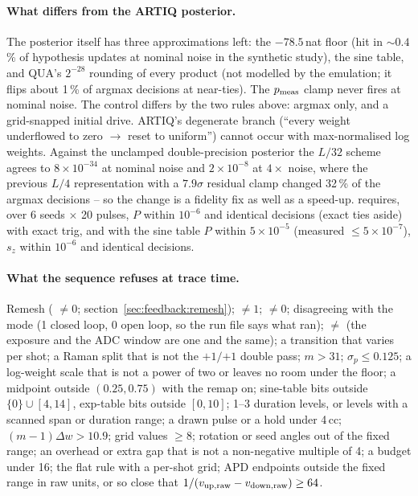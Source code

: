 \paragraph{What differs from the ARTIQ posterior.} The posterior itself has
three approximations left: the $-78.5$\,nat floor (hit in $\sim 0.4$\,\% of
hypothesis updates at nominal noise in the synthetic study), the sine table,
and QUA's $2^{-28}$ rounding of every product (not modelled by the
emulation; it flips about 1\,\% of argmax decisions at near-ties). The
$p_{\rm meas}$ clamp never fires at nominal noise. The control differs by the
two rules above: argmax only, and a grid-snapped initial drive. ARTIQ's
degenerate branch (``every weight underflowed to zero $\to$ reset to uniform'')
cannot occur with max-normalised log weights. Against the unclamped
double-precision posterior the $L/32$ scheme agrees to $8\times 10^{-34}$ at
nominal noise and $2\times 10^{-8}$ at $4\times$ noise, where the previous $L/4$
representation with a $7.9\sigma$ residual clamp changed 32\,\% of the argmax
decisions -- so the change is a fidelity fix as well as a speed-up.
 requires, over 6
seeds $\times$ 20 pulses, $P$ within $10^{-6}$ and identical decisions (exact
ties aside) with exact trig, and with the sine table $P$ within
$5\times 10^{-5}$ (measured $\le 5\times 10^{-7}$), $s_z$ within $10^{-6}$ and
identical decisions.

\paragraph{What the sequence refuses at trace time.} Remesh
( $\ne 0$; section~\ref{sec:feedback:remesh});
 $\ne 1$; 
$\ne 0$;  disagreeing with the mode (1
closed loop, 0 open loop, so the run file says what ran); 
$\ne$  (the exposure and the ADC window are
one and the same); a transition that varies per shot; a Raman split that is
not the $+1/{+1}$ double pass; $m > 31$; $\sigma_p \le 0.125$; a log-weight
scale that is not a power of two or leaves no room under the floor; a
midpoint outside $(0.25, 0.75)$ with the remap on; sine-table bits outside
$\{0\} \cup [4, 14]$, exp-table bits outside $[0, 10]$; 1--3 duration levels, or
levels with a scanned span or duration range; a drawn pulse or a hold under
4\,cc; $(m-1)\Delta w > 10.9$; grid values $\ge 8$; rotation or seed angles out of
the fixed range; an overhead or extra gap that is not a non-negative multiple
of 4\nsu; a budget under 16\nsu; the flat rule with a per-shot grid; APD
endpoints outside the fixed range in raw units, or so close that
$1/(v_{\rm up,raw} - v_{\rm down,raw}) \ge 64$.

